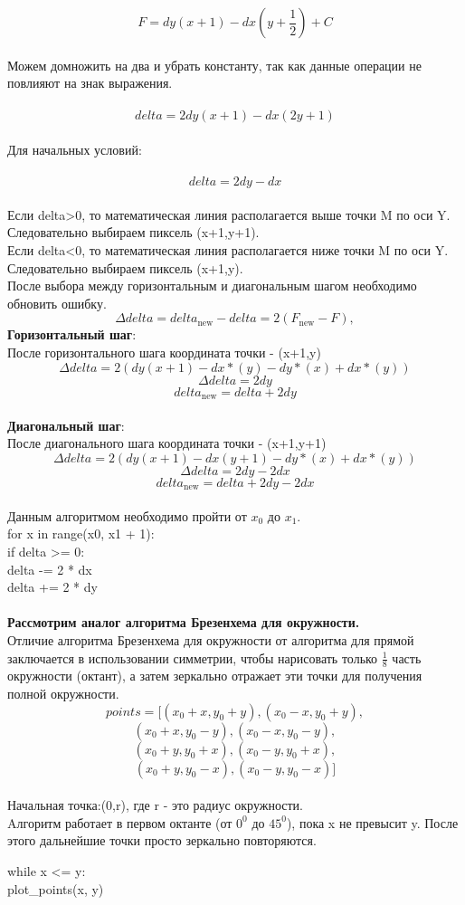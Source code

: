 \documentclass[a4paper, 12pt]{article}
\begin{document}
\[F=dy(x+1)-dx(y+\frac{1}{2})+C\]
\\
Можем домножить на два и убрать константу, так как данные операции не повлияют на знак выражения.\\
\\
\[delta=2dy(x+1)-dx(2y+1)\]
\\
Для начальных условий:\\
\\
\[delta=2dy-dx\]
\\
Если delta>0, то математическая линия располагается выше точки M по оси Y. Следовательно выбираем пиксель (x+1,y+1).\\
Если delta<0, то математическая линия располагается ниже точки M по оси Y. Следовательно выбираем пиксель (x+1,y).\\
После выбора между горизонтальным и диагональным шагом необходимо обновить ошибку.\\
\[\Delta delta=delta_{\text{new}}-delta=2(F_{\text{new}}-F) ,\]
\textbf{Горизонтальный шаг}:\\
После горизонтального шага координата точки - (x+1,y)\\
\[\Delta delta=2(dy(x+1)-dx*(y)-dy*(x)+dx*(y))\]
\[\Delta delta=2dy\]
\[delta_{\text{new}}=delta+2dy\]\\
\newpage
\noindent\textbf{Диагональный шаг}:\\
После диагонального шага координата точки - (x+1,y+1)\\
\[\Delta delta=2(dy(x+1)-dx(y+1)-dy*(x)+dx*(y))\]
\[\Delta delta=2dy-2dx\]
\[delta_{\text{new}}=delta+2dy-2dx\]\\
Данным алгоритмом необходимо пройти от $x_0$ до $x_1$.\\
for x in range(x0, x1 + 1):\\
 if delta >= 0:\\
        \indent    delta -= 2 * dx\\
        delta += 2 * dy\\
        \\
\textbf{Рассмотрим аналог алгоритма Брезенхема для окружности.}\\
Отличие алгоритма Брезенхема для окружности от алгоритма для прямой заключается в использовании
симметрии, чтобы нарисовать только $\frac{1}{8}$ часть окружности (октант), а затем зеркально отражает эти точки для получения полной окружности.
  \[points = [
                (x_0 + x , y_0 + y), (x_0 - x , y_0 + y),\]
               \[ (x_0 + x , y_0 - y), (x_0 - x , y_0 - y),\]
                \[(x_0 + y, y_0 + x ), (x_0 - y, y_0 + x ),\]
              \[  (x_0 + y, y_0 - x ), (x_0 - y, y_0 - x )
            ]\]\\
Начальная точка:(0,r), где r - это радиус окружности.\\
Aлгоритм работает в первом октанте (от $0^0$ до $45^0$), пока x не превысит y. После этого дальнейшие точки просто зеркально повторяются.
\begin{center}
     while x <= y:\\
        plot\_points(x, y)
\end{center}
\end{document}
